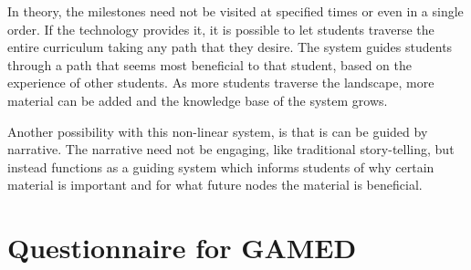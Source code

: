 \documentclass[11pt]{article}
\begin{document}
In theory, the milestones need not be visited at specified times or even in a single order. If the technology provides it, it is possible to let students traverse the entire curriculum taking any path that they desire. The system guides students through a path that seems most beneficial to that student, based on the experience of other students. As more students traverse the landscape, more material can be added and the knowledge base of the system grows.

Another possibility with this non-linear system, is that is can be guided by narrative. The narrative need not be engaging, like traditional story-telling, but instead functions as a guiding system which informs students of why certain material is important and for what future nodes the material is beneficial. 

\newpage
\section{Questionnaire for GAMED}
\end{document}
